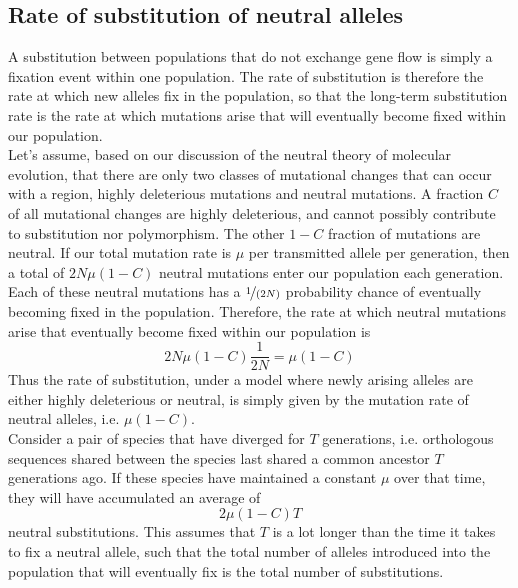 \subsection{Rate of substitution of neutral alleles}

A substitution between populations that do not exchange gene flow is simply a
fixation event within one population. The rate of substitution is therefore the
rate at which new alleles fix in the population, so that the long-term
substitution rate is the rate at which mutations arise that will eventually
become fixed within our population.\\

Let's assume, based on our discussion of the neutral theory of molecular evolution, that there are only two classes of mutational changes that can occur with a
region, highly deleterious mutations and neutral mutations. A fraction $C$ of
all mutational changes are highly deleterious, and cannot possibly contribute
to substitution nor polymorphism.  The other $1-C$ fraction
of mutations are neutral. If our total mutation rate is $\mu$ per transmitted allele
per generation, then a total of $2N \mu (1-C)$ neutral mutations enter our
population each generation.\\

Each of these neutral mutations has a $\nicefrac{1}{(2N)}$ probability chance of
eventually becoming fixed in the population. Therefore, the rate at
which neutral mutations arise that eventually become fixed within our
population is
\begin{equation}
2N\mu(1-C)\frac{1}{2N} = \mu(1-C)
\end{equation}
Thus the rate of substitution, under a model where newly arising alleles are either
highly deleterious or neutral, is simply given by the mutation rate
of neutral alleles, i.e. $\mu(1-C)$.\\

Consider a pair of species that have diverged for $T$ generations, i.e. orthologous sequences shared between the species last shared a common ancestor $T$ generations ago. If these species have maintained a constant $\mu$ over that time, they will have accumulated an average of
\begin{equation}
2\mu(1-C)T \label{eqn:moleclock}
\end{equation}
neutral substitutions. This assumes that $T$ is a lot longer than the time it
takes to fix a neutral allele, such that the total number of
alleles introduced into the population that will eventually fix is the
total number of substitutions.\\

